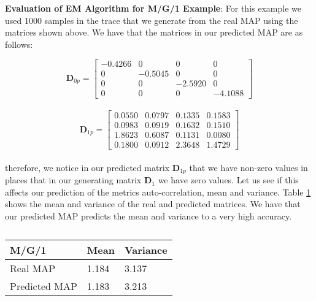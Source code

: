 \documentclass[a4paper,11pt,titlepage]{article}
\begin{document}
\textbf{Evaluation of EM Algorithm for M/G/1 Example}: For this example we used 1000 samples in the trace that we generate from the real MAP using the matrices shown above. We have that the matrices in our predicted MAP are as follows: 

\begin{equation}
    \mathbf{D}_{0p} = \begin{bmatrix}
-0.4266    &     0   &      0    &     0 \\
0  & -0.5045 &       0    &     0 \\
0  &  0 &  -2.5920    &     0 \\
0    &  0  &  0 &  -4.1088
    \end{bmatrix}
\end{equation} \\

\begin{equation}
    \mathbf{D}_{1p} = \begin{bmatrix}
    0.0550  &  0.0797  &  0.1335  &  0.1583 \\
    0.0983  &  0.0919  &  0.1632  &  0.1510 \\
    1.8623  &  0.6087  &  0.1131  &  0.0080 \\
    0.1800  &  0.0912  &  2.3648  &  1.4729
    \end{bmatrix}
\end{equation} \\

therefore, we notice in our predicted matrix $\mathbf{D}_{1p}$ that we have non-zero values in places that in our generating matrix $\mathbf{D}_1$ we have zero values. Let us see if this affects our prediction of the metrics auto-correlation, mean and variance. Table \ref{tab:mg1_mean_var} shows the mean and variance of the real and predicted matrices. We have that our predicted MAP predicts the mean and variance to a very high accuracy. \\ 

\begin{table}[h!]
\begin{center}
\begin{tabular}{|l|l|l|}
\hline
M/G/1 & Mean & Variance \\ \hline
Real MAP & 1.184 & 3.137 \\ \hline
Predicted MAP & 1.183 & 3.213 \\ \hline
\end{tabular}
\caption{}
\label{tab:mg1_mean_var}
\end{center}
\end{table}
\end{document}
